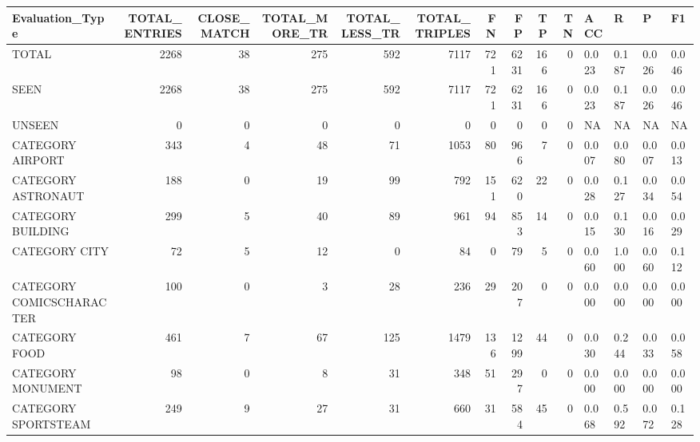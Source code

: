 \begin{tabular}{lrrrrrrrrrllll}
\hline
 Evaluation\_Type          &   TOTAL\_ENTRIES &   CLOSE\_MATCH &   TOTAL\_MORE\_TR &   TOTAL\_LESS\_TR &   TOTAL\_TRIPLES &   FN &   FP &   TP &   TN & ACC   & R     & P     & F1    \\
\hline
 TOTAL                    &            2268 &            38 &             275 &             592 &            7117 &  721 & 6231 &  166 &    0 & 0.023 & 0.187 & 0.026 & 0.046 \\
 SEEN                     &            2268 &            38 &             275 &             592 &            7117 &  721 & 6231 &  166 &    0 & 0.023 & 0.187 & 0.026 & 0.046 \\
 UNSEEN                   &               0 &             0 &               0 &               0 &               0 &    0 &    0 &    0 &    0 & NA    & NA    & NA    & NA    \\
 CATEGORY AIRPORT         &             343 &             4 &              48 &              71 &            1053 &   80 &  966 &    7 &    0 & 0.007 & 0.080 & 0.007 & 0.013 \\
 CATEGORY ASTRONAUT       &             188 &             0 &              19 &              99 &             792 &  151 &  620 &   22 &    0 & 0.028 & 0.127 & 0.034 & 0.054 \\
 CATEGORY BUILDING        &             299 &             5 &              40 &              89 &             961 &   94 &  853 &   14 &    0 & 0.015 & 0.130 & 0.016 & 0.029 \\
 CATEGORY CITY            &              72 &             5 &              12 &               0 &              84 &    0 &   79 &    5 &    0 & 0.060 & 1.000 & 0.060 & 0.112 \\
 CATEGORY COMICSCHARACTER &             100 &             0 &               3 &              28 &             236 &   29 &  207 &    0 &    0 & 0.000 & 0.000 & 0.000 & 0.000 \\
 CATEGORY FOOD            &             461 &             7 &              67 &             125 &            1479 &  136 & 1299 &   44 &    0 & 0.030 & 0.244 & 0.033 & 0.058 \\
 CATEGORY MONUMENT        &              98 &             0 &               8 &              31 &             348 &   51 &  297 &    0 &    0 & 0.000 & 0.000 & 0.000 & 0.000 \\
 CATEGORY SPORTSTEAM      &             249 &             9 &              27 &              31 &             660 &   31 &  584 &   45 &    0 & 0.068 & 0.592 & 0.072 & 0.128 \\

\end{tabular}
